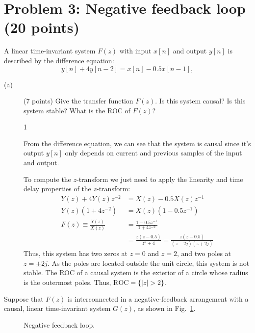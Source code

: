\documentclass[10pt]{article}
\def\SOLUTIONS{0} %
\def\SolutionsColor{red2}
\begin{document}
\section*{Problem 3: Negative feedback loop (20 points)}
A linear time-invariant system $F(z)$ with input $x[n]$ and output $y[n]$ is described by the difference equation:
\begin{equation}
	y[n] + 4y[n-2] = x[n] -0.5x[n-1],
\end{equation}
\begin{description}
	\item[(a)] (7 points) Give the transfer function $F(z)$. Is this system causal? Is this system stable? What is the ROC of $F(z)$?
	
	\if\SOLUTIONS1
	{\color{\SolutionsColor}
		From the difference equation, we can see that the system is causal since it's output $y[n]$ only depends on current and previous samples of the input and output.
		
		To compute the $z$-transform we just need to apply the linearity and time delay properties of the $z$-transform:
		\begin{align} \nonumber
			Y(z) + 4Y(z)z^{-2} &= X(z) -0.5X(z)z^{-1} \\
			Y(z)(1 + 4z^{-2}) &= X(z)(1 -0.5z^{-1}) \\ \nonumber
			F(z) \equiv \frac{Y(z)}{X(z)} &= \frac{1 -0.5z^{-1}}{1 + 4z^{-2}} \\ \nonumber
			&= \frac{z(z - 0.5)}{z^2 + 4} = \frac{z(z - 0.5)}{(z -2j)(z + 2j)}
		\end{align}
		Thus, this system has two zeros at $z = 0$ and $z = 2$, and two poles at $z = \pm 2j$. As the poles are located outside the unit circle, this system is not stable. The ROC of a causal system is the exterior of a circle whose radius is the outermost poles. Thus, $\mathrm{ROC} = \{|z| > 2\}$.
	}	
	\else\vspace{7cm}
	\fi

\end{description}
\noindent Suppose that $F(z)$ is interconnected in a negative-feedback arrangement with a causal, linear time-invariant system $G(z)$, as shown in Fig.~\ref{fig:feedback-loop}.

\begin{figure}[!h]
	\centering
	\resizebox{0.5\textwidth}{!}{}
	\caption{Negative feedback loop.} \label{fig:feedback-loop}
\end{figure}
\end{document}
